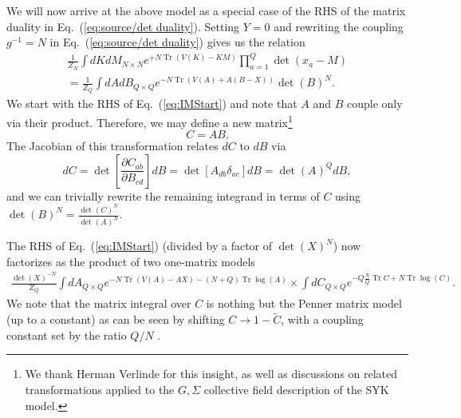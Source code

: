 \documentclass[english]{article}
\DeclareMathOperator{\Tr}{Tr}
\begin{document}
We will now arrive at the above model as a  special case of the RHS of the matrix duality in Eq.~(\ref{eq:source/det duality}). Setting $Y=0$ and rewriting the coupling $g^{-1}=N$ in Eq.~(\ref{eq:source/det duality}) gives us the relation
\begin{eqnarray} \label{eq:IMStart}
   & \frac{1}{Z_{N}} \int dK dM_{N \times N} e^{+ N \Tr \left( V(K) - KM \right)} \prod_{a=1}^{Q} \det(x_{a}-M) & \nonumber \\ 
     & =  \frac{1}{Z_{Q}}\int dA dB_{Q \times Q} e^{- N \Tr \left( V(A) + A(B-X) \right)}  \det(B)^{N}. &
\end{eqnarray}
We start with the RHS of Eq.~(\ref{eq:IMStart}) and note that $A$ and $B$ couple only via their product. Therefore, we may define a new matrix\footnote{We thank Herman Verlinde for this insight, as well as discussions on related transformations applied to the $G,\Sigma$ collective field description of the SYK model.}  \begin{equation}
    C = AB .
\end{equation}
The Jacobian of this transformation relates $dC$ to $dB$ via
\begin{equation}
    dC = \det\left[ \frac{\partial C_{ab}}{\partial B_{cd} }\right] dB = \det[A_{db} \delta_{ac}] dB = \det(A)^Q dB , 
\end{equation}
and we can trivially rewrite the remaining integrand in terms of $C$ using $\det(B)^{N}= \frac{\det(C)^{N}}{\det(A)^N}.$

The RHS of Eq.~(\ref{eq:IMStart}) (divided by a factor of $\det(X)^N$) now factorizes as the product of two one-matrix models
\begin{align}
     \frac{ \det(X)^{-N} }{Z_{Q}} \int dA_{Q\times Q} e^{-N \Tr \left(V(A)-AX \right)-(N+Q)\Tr \log(A)} \times \int dC_{Q\times Q} e^{-Q \frac{N}{Q}\Tr C + N \Tr \log(C) } .
\end{align}
We note that the matrix integral over $C$ is nothing but the Penner matrix model (up to a constant) as can be seen by  shifting $C \rightarrow 1-\tilde{C}$, with a coupling constant set by the ratio $Q/N$ \cite{harer1986euler, penner1988perturbative}. 
\end{document}
